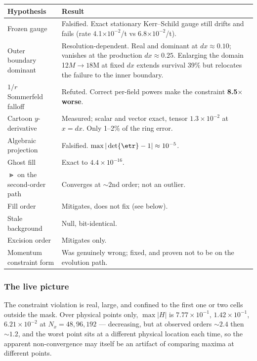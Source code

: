 \begin{longtable}{@{}>{\raggedright\arraybackslash}p{4.50cm}>{\raggedright\arraybackslash}p{9.00cm}@{}}
\toprule
\textbf{Hypothesis} & \textbf{Result} \\
\midrule
\endhead
Frozen gauge & Falsified. Exact stationary Kerr--Schild gauge still drifts and fails (rate 4.1$\times10^{-2}$/t vs 6.8$\times10^{-2}$/t). \\
Outer boundary dominant & Resolution-dependent. Real and dominant at $dx\approx0.10$; vanishes at the production $dx\approx0.25$. Enlarging the domain 12$M \to 18$M at fixed $dx$ extends survival 39\% but relocates the failure to the inner boundary. \\
$1/r$ Sommerfeld falloff & Refuted. Correct per-field powers make the constraint \textbf{8.5$\times$ worse}. \\
Cartoon $y$-derivative & Measured; scalar and vector exact, tensor $1.3\times10^{-2}$ at $x = dx$. Only 1--2\% of the ring error. \\
Algebraic projection & Falsified. $\max|\det\etr - 1| \approx 10^{-5}$. \\
Ghost fill & Exact to $4.4\times10^{-16}$. \\
$\Gt$ on the second-order path & Converges at $\sim 2$nd order; not an outlier. \\
Fill order & Mitigates, does not fix (see below). \\
Stale background & Null, bit-identical. \\
Excision order & Mitigates only. \\
Momentum constraint form & Was genuinely wrong; fixed, and proven not to be on the evolution path. \\
\bottomrule
\end{longtable}

\subsubsection{The live picture}

The constraint violation is real, large, and confined to the first one or two
cells outside the mask. Over physical points only, $\max|H|$ is
$7.77\times10^{-1}$, $1.42\times10^{-1}$, $6.21\times10^{-2}$ at
$N_x = 48, 96, 192$ --- decreasing, but at observed orders $\sim 2.4$ then
$\sim 1.2$, and the worst point sits at a different physical location each
time, so the apparent non-convergence may itself be an artifact of comparing
maxima at different points.


